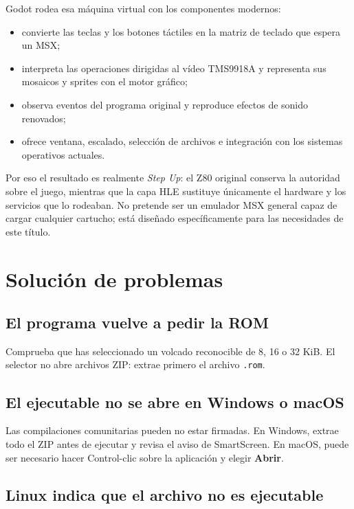 \documentclass[11pt,a4paper]{article}
\begin{document}
Godot rodea esa máquina virtual con los componentes modernos:

\begin{itemize}
  \item convierte las teclas y los botones táctiles en la matriz de teclado
        que espera un MSX;
  \item interpreta las operaciones dirigidas al vídeo TMS9918A y representa
        sus mosaicos y sprites con el motor gráfico;
  \item observa eventos del programa original y reproduce efectos de sonido
        renovados;
  \item ofrece ventana, escalado, selección de archivos e integración con los
        sistemas operativos actuales.
\end{itemize}

Por eso el resultado es realmente \textit{Step Up}: el Z80 original conserva
la autoridad sobre el juego, mientras que la capa HLE sustituye únicamente el
hardware y los servicios que lo rodeaban. No pretende ser un emulador MSX
general capaz de cargar cualquier cartucho; está diseñado específicamente
para las necesidades de este título.

\section{Solución de problemas}

\subsection*{El programa vuelve a pedir la ROM}

Comprueba que has seleccionado un volcado reconocible de 8, 16 o 32 KiB. El
selector no abre archivos ZIP: extrae primero el archivo \texttt{.rom}.

\subsection*{El ejecutable no se abre en Windows o macOS}

Las compilaciones comunitarias pueden no estar firmadas. En Windows, extrae
todo el ZIP antes de ejecutar y revisa el aviso de SmartScreen. En macOS,
puede ser necesario hacer Control-clic sobre la aplicación y elegir
\textbf{Abrir}.

\subsection*{Linux indica que el archivo no es ejecutable}
\end{document}
